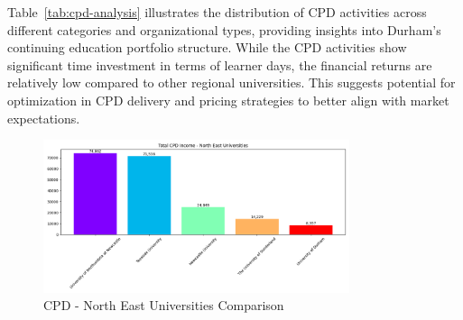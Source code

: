 \documentclass[journal,onecolumn, 10pt,draftclsnofoot]{IEEEtran}
\begin{document}
Table~\ref{tab:cpd-analysis} illustrates the distribution of CPD activities across different categories and organizational types, providing insights into Durham's continuing education portfolio structure. While the CPD activities show significant time investment in terms of learner days, the financial returns are relatively low compared to other regional universities. This suggests potential for optimization in CPD delivery and pricing strategies to better align with market expectations.
\vspace{0.3cm}
\begin{table}[h]
\centering
\caption{CPD and Continuing Education Analysis - Durham University}
\vspace{0.1cm}
\label{tab:cpd-analysis}
\end{table}

\begin{figure}[h]
\centering
\includegraphics[width=0.8\textwidth]{Fig/figure13.cpd_ne_comparison.png}
\caption{CPD - North East Universities Comparison}
\label{fig:cpd-ne-comparison}
\end{figure}
\end{document}
